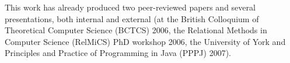 This work has already produced two peer-reviewed papers \cite{nt,
  dynamite} and several presentations, both internal and external (at
the British Colloquium of Theoretical Computer Science (BCTCS) 2006,
the Relational Methods in Computer Science (RelMiCS) PhD workshop
2006, the University of York and Principles and Practice of
Programming in Java (PPPJ) 2007).

